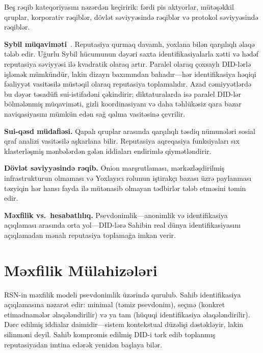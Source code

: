 \documentclass[11pt,a4paper,twocolumn]{article}
\begin{document}
Beş rəqib kateqoriyasını nəzərdən keçiririk: fərdi pis aktyorlar, mütəşəkkil qruplar, korporativ rəqiblər, dövlət səviyyəsində rəqiblər və protokol səviyyəsində rəqiblər.

\textbf{Sybil müqaviməti}~\cite{douceur2002}. Reputasiya qurmaq davamlı, yoxlana bilən qarşılıqlı əlaqə tələb edir. Uğurlu Sybil hücumunun dəyəri saxta identifikasiyalarla xətti və hədəf reputasiya səviyyəsi ilə kvadratik olaraq artır. Paralel olaraq çoxsaylı DID-lərlə işləmək mümkündür, lakin dizayn baxımından bahadır---hər identifikasiya həqiqi fəaliyyət vasitəsilə müstəqil olaraq reputasiya toplamalıdır. Azad cəmiyyətlərdə bu dəyər təsadüfi sui-istifadəni çəkindirir; diktaturalarda isə paralel DID-lər bölmələnmiş müqaviməti, gizli koordinasiyanı və daha təhlükəsiz qara bazar naviqasiyasını mümkün edən sağ qalma vasitəsinə çevrilir.

\textbf{Sui-qəsd müdafiəsi.} Qapalı qruplar arasında qarşılıqlı təsdiq nümunələri sosial qraf analizi vasitəsilə aşkarlana bilir. Reputasiya aqreqasiya funksiyaları sıx klasterləşmiş mənbələrdən gələn iddiaları endirimlə qiymətləndirir.

\textbf{Dövlət səviyyəsində rəqib.} Onion marşrutlaması, mərkəzləşdirilmiş infrastrukturun olmaması və Yoxlayıcı rolunun iştirakçı bazası üzrə paylanması təzyiqin hər hansı fayda ilə mütənasib olmayan tədbirlər tələb etməsini təmin edir.

\textbf{Məxfilik vs.\ hesabatlılıq.} Psevdonimlik---anonimlik və identifikasiya açıqlaması arasında orta yol---DID-lərə Sahibin real dünya identifikasiyasını açıqlamadan mənalı reputasiya toplamağa imkan verir.

\section{Məxfilik Mülahizələri}

RSN-in məxfilik modeli psevdonimlik üzərində qurulub. Sahib identifikasiya açıqlamasına nəzarət edir: minimal (təmiz psevdonim), seçmə (konkret etimadnamələr əlaqələndirilir) və ya tam (hüquqi identifikasiya əlaqələndirilir). Dərc edilmiş iddialar daimidir---sistem kontekstual düzəlişi dəstəkləyir, lakin silinməni deyil. Sahib kompromis edilmiş DID-i tərk edib toplanmış reputasiyadan imtina edərək yenidən başlaya bilər.

\end{document}
